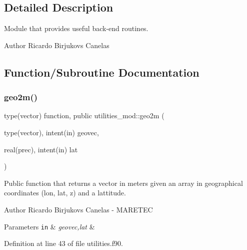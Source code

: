 \subsection{Detailed Description}
Module that provides useful back-\/end routines. 

\begin{DoxyAuthor}{Author}
Ricardo Birjukovs Canelas 
\end{DoxyAuthor}


\subsection{Function/\+Subroutine Documentation}
\mbox{\label{namespaceutilities__mod_a415de70150d626b1e8c6e0c8c0e09e8b}} 
\subsubsection{\texorpdfstring{geo2m()}{geo2m()}}
{\footnotesize\ttfamily type(vector) function, public utilities\+\_\+mod\+::geo2m (\begin{DoxyParamCaption}\item[{type(vector), intent(in)}]{geovec,  }\item[{real(prec), intent(in)}]{lat }\end{DoxyParamCaption})}



Public function that returns a vector in meters given an array in geographical coordinates (lon, lat, z) and a lattitude. 

\begin{DoxyAuthor}{Author}
Ricardo Birjukovs Canelas -\/ M\+A\+R\+E\+T\+EC 
\end{DoxyAuthor}

\begin{DoxyParams}[1]{Parameters}
\mbox{\tt in}  & {\em geovec,lat} & \\
\hline
\end{DoxyParams}


Definition at line 43 of file utilities.\+f90.


